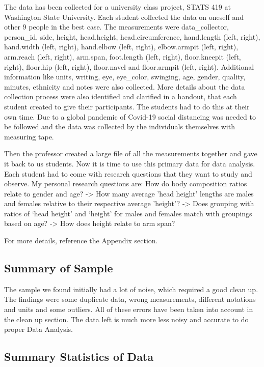 \documentclass[]{article}
\begin{document}
The data has been collected for a university class project, STATS 419 at
Washington State University. Each student collected the data on oneself
and other 9 people in the best case. The measurements were
data\_collector, person\_id, side, height, head.height,
head.circumference, hand.length (left, right), hand.width (left, right),
hand.elbow (left, right), elbow.armpit (left, right), arm.reach (left,
right), arm.span, foot.length (left, right), floor.kneepit (left,
right), floor.hip (left, right), floor.navel and floor.armpit (left,
right). Additional information like units, writing, eye, eye\_color,
swinging, age, gender, quality, minutes, ethnicity and notes were also
collected. More details about the data collection process were also
identified and clarified in a handout, that each student created to give
their participants. The students had to do this at their own time. Due
to a global pandemic of Covid-19 social distancing was needed to be
followed and the data was collected by the individuals themselves with
measuring tape.

Then the professor created a large file of all the measurements together
and gave it back to us students. Now it is time to use this primary data
for data analysis. Each student had to come with research questions that
they want to study and observe. My personal research questions are: How
do body composition ratios relate to gender and age? -\textgreater{} How
many average 'head height' lengths are males and females relative to
their respective average 'height'? -\textgreater{} Does grouping with
ratios of `head height' and `height' for males and females match with
groupings based on age? -\textgreater{} How does height relate to arm
span?

For more details, reference the Appendix section.

\subsection{Summary of Sample}
\label{sec:data-sample}

The sample we found initially had a lot of noise, which required a good
clean up. The findings were some duplicate data, wrong measurements,
different notations and units and some outliers. All of these errors
have been taken into account in the clean up section. The data left is
much more less noisy and accurate to do proper Data Analysis.

\subsection{Summary Statistics of Data}
\label{sec:data-summary}
\end{document}
